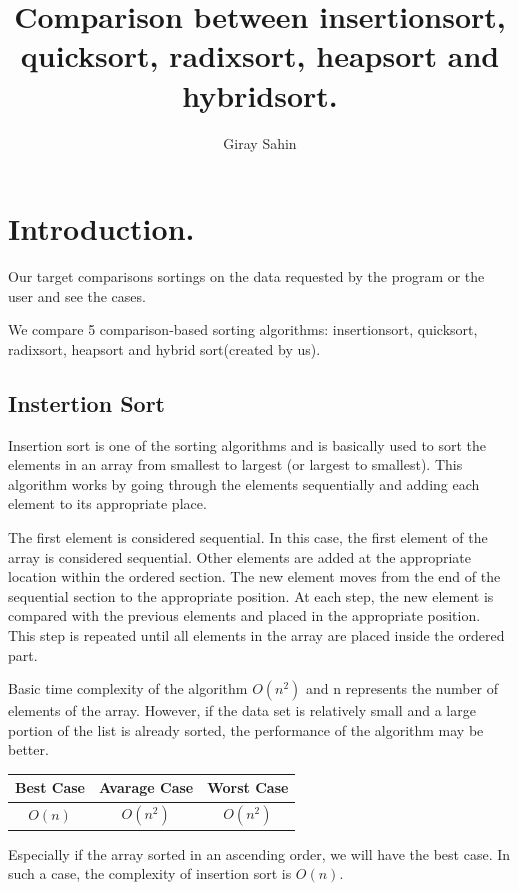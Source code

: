 \documentclass{article}
\title{Comparison between insertionsort, quicksort, radixsort, heapsort and hybridsort.}
\author{Giray Sahin}
\begin{document}
\maketitle
\section{Introduction.}
Our target comparisons sortings on the data requested by the program or the user and see the cases.

We compare 5 comparison-based sorting algorithms: insertionsort, quicksort, radixsort, heapsort and hybrid sort(created by us).

\subsection{Instertion Sort}
Insertion sort is one of the sorting algorithms and is basically used to sort the elements in an array from smallest to largest (or largest to smallest). This algorithm works by going through the elements sequentially and adding each element to its appropriate place.

The first element is considered sequential. In this case, the first element of the array is considered sequential. Other elements are added at the appropriate location within the ordered section. The new element moves from the end of the sequential section to the appropriate position. At each step, the new element is compared with the previous elements and placed in the appropriate position.
This step is repeated until all elements in the array are placed inside the ordered part.

Basic time complexity of the algorithm $O(n^2)$ and n represents the number of elements of the array. However, if the data set is relatively small and a large portion of the list is already sorted, the performance of the algorithm may be better.

\begin{center}
\begin{tabular}{|c|c|c|}
 \hline
Best Case & Avarage Case & Worst Case  \\
\hline
$O(n)$ &$ O(n^2)$ & $O(n^2)$ \\
\hline
\end{tabular}
\end{center}

Especially if the array sorted in an ascending order, we will have the best case. In such a case, the complexity
of insertion sort is $O(n)$.
\end{document}
